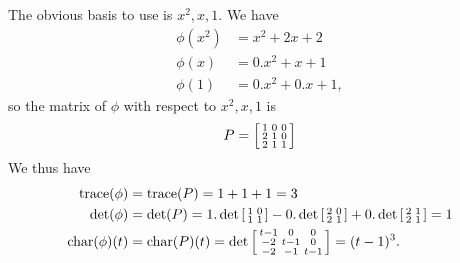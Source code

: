  The obvious basis to use is $x^2,x,1$.  We have
 \begin{align*}
  \phi(x^2) &= x^2 + 2x + 2 \\
  \phi(x)  &= 0.x^2 + x + 1 \\
  \phi(1)  &= 0.x^2 + 0.x + 1,
 \end{align*}
 so the matrix of $\phi$ with respect to $x^2,x,1$ is
 \[ P = \left[\begin{smallmatrix} 1 & 0 & 0 \\ 2 & 1 & 0 \\ 2 & 1 & 1 \end{smallmatrix}\right] \]
 We thus have
 \begin{align*}
  \operatorname{trace}(\phi) &= \operatorname{trace}(P) = 1+1+1 = 3 \\
  \det(\phi) &= \det(P) = 1.\det\left[\begin{smallmatrix} 1&0\\1&1\end{smallmatrix}\right]  -
                          0.\det\left[\begin{smallmatrix} 2&0\\2&1\end{smallmatrix}\right] +
                          0.\det\left[\begin{smallmatrix} 2&1\\2&1\end{smallmatrix}\right] = 1\\
  \operatorname{char}(\phi)(t) &= \operatorname{char}(P)(t) =
    \det\left[\begin{smallmatrix} t-1 & 0 & 0 \\ -2 & t-1 & 0 \\ -2 & -1 & t-1 \end{smallmatrix}\right] =
    (t-1)^3.
 \end{align*}
\EndDeferredSolution

